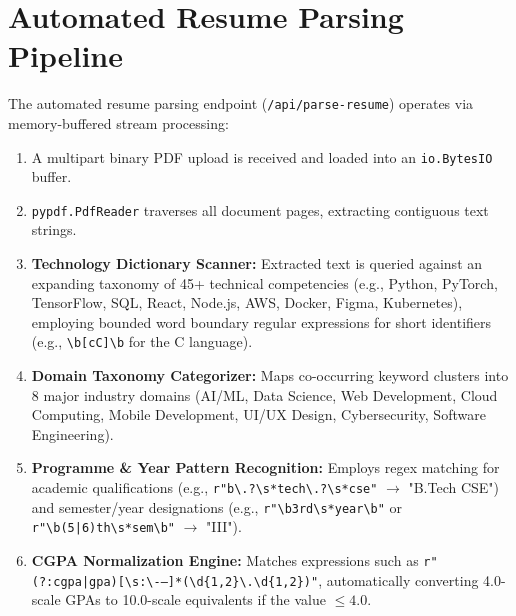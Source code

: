 \section{Automated Resume Parsing Pipeline} \label{S4.4}
The automated resume parsing endpoint (\texttt{/api/parse-resume}) operates via memory-buffered stream processing:
\begin{enumerate}[label=\textbf{\arabic*.}]
	\item A multipart binary PDF upload is received and loaded into an \texttt{io.BytesIO} buffer.
	\item \texttt{pypdf.PdfReader} traverses all document pages, extracting contiguous text strings.
	\item \textbf{Technology Dictionary Scanner:} Extracted text is queried against an expanding taxonomy of 45+ technical competencies (e.g., Python, PyTorch, TensorFlow, SQL, React, Node.js, AWS, Docker, Figma, Kubernetes), employing bounded word boundary regular expressions for short identifiers (e.g., \texttt{\textbackslash b[cC]\textbackslash b} for the C language).
	\item \textbf{Domain Taxonomy Categorizer:} Maps co-occurring keyword clusters into 8 major industry domains (AI/ML, Data Science, Web Development, Cloud Computing, Mobile Development, UI/UX Design, Cybersecurity, Software Engineering).
	\item \textbf{Programme \& Year Pattern Recognition:} Employs regex matching for academic qualifications (e.g., \texttt{r"b\textbackslash.?\textbackslash s*tech\textbackslash.?\textbackslash s*cse"} $\to$ "B.Tech CSE") and semester/year designations (e.g., \texttt{r"\textbackslash b3rd\textbackslash s*year\textbackslash b"} or \texttt{r"\textbackslash b(5|6)th\textbackslash s*sem\textbackslash b"} $\to$ "III").
	\item \textbf{CGPA Normalization Engine:} Matches expressions such as \texttt{r"(?:cgpa|gpa)[\textbackslash s:\textbackslash -–]*(\textbackslash d\{1,2\}\textbackslash .\textbackslash d\{1,2\})"}, automatically converting 4.0-scale GPAs to 10.0-scale equivalents if the value $\le 4.0$.
\end{enumerate}

